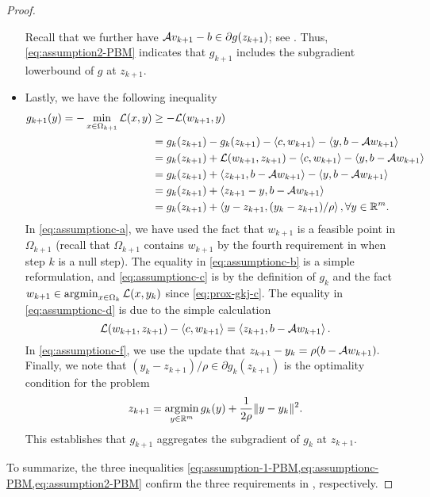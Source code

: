 \documentclass[11pt]{article}
\begin{document}
\begin{proof}
\begin{itemize}
        Recall that we further have $\mathcal{A} v_{k+1} - b \in \partial g(z_{k+1})$; see . Thus, \cref{eq:assumption2-PBM} indicates that $g_{k+1}$ includes the subgradient lowerbound of $g$ at $z_{k+1}$. 

    \item Lastly, we have the following inequality   
        \begin{subequations} \label{eq:assumptionc-PBM}
            \begin{align}
                  g_{k+1}(y) 
                 = -\min_{x \in \Omega_{k+1}} \mathcal{L}(x,y) 
                 & \geq -\mathcal{L}(w_{k+1},y) \label{eq:assumptionc-a} \\
                & = g_{k}(z_{k+1}) - g_{k}(z_{k+1}) -  \left \langle c, w_{k+1} \right\rangle - \left \langle y, b-\mathcal{A} w_{k+1}  \right\rangle \label{eq:assumptionc-b}\\
                & = g_{k}(z_{k+1}) +  \mathcal{L}(w_{k+1},z_{k+1}) - \left \langle c, w_{k+1} \right\rangle - \left \langle y, b-\mathcal{A} w_{k+1} \right\rangle \label{eq:assumptionc-c}\\
                & = g_{k}(z_{k+1}) +\left \langle z_{k+1}, b-\mathcal{A} w_{k+1} \right\rangle - \left \langle y, b-\mathcal{A} w_{k+1} \right\rangle \label{eq:assumptionc-d} \\
                & = g_{k}(z_{k+1}) + \left \langle z_{k+1}- y, b-\mathcal{A} w_{k+1} \right\rangle \label{eq:assumptionc-e} \\
                & = g_{k}(z_{k+1}) + \left \langle y - z_{k+1}, (y_k - z_{k+1})/\rho \right\rangle, \forall y \in \mathbb{R}^m. \label{eq:assumptionc-f}
            \end{align}
        \end{subequations}
        In \cref{eq:assumptionc-a}, we have used the fact that $w_{k+1}$ is a feasible point in $\Omega_{k+1}$ (recall that $\Omega_{k+1}$ contains $w_{k+1}$ by the fourth requirement in  when step $k$ is a null step). The equality in \cref{eq:assumptionc-b} is a simple reformulation, and \cref{eq:assumptionc-c} is by the definition of $g_k$ and the fact $ w_{k+1} \in \operatorname*{\arg\!\min}_{x\in \Omega_k} \mathcal{L}(x,y_k)$ since \cref{eq:prox-gkj-c}. The equality in \cref{eq:assumptionc-d} is due to the simple calculation 
        $$
        \mathcal{L}(w_{k+1},z_{k+1}) - \left \langle c, w_{k+1} \right\rangle = \left \langle z_{k+1}, b-\mathcal{A} w_{k+1} \right\rangle. 
        $$
        In \cref{eq:assumptionc-f}, we use the update that 
        $
        z_{k+1} - y_k = \rho(b - \mathcal{A} w_{k+1}).
        $ 
        Finally, we note that $(y_k - z_{k+1})/\rho \in \partial g_{k}(z_{k+1})$ is the optimality condition for the problem
        $$z_{k+1} = \operatorname*{\arg\!\min}_{y \in \mathbb{R}^m} g_{k}(y) + \frac{1}{2\rho} \|y - y_k\|^2.$$
        This establishes that $g_{k+1}$ aggregates the subgradient of $g_{k}$ at $z_{k+1}$. 
    \end{itemize}

To summarize, the three inequalities \cref{eq:assumption-1-PBM,eq:assumptionc-PBM,eq:assumption2-PBM} confirm the three requirements in , respectively. 
\end{proof}
\end{document}
